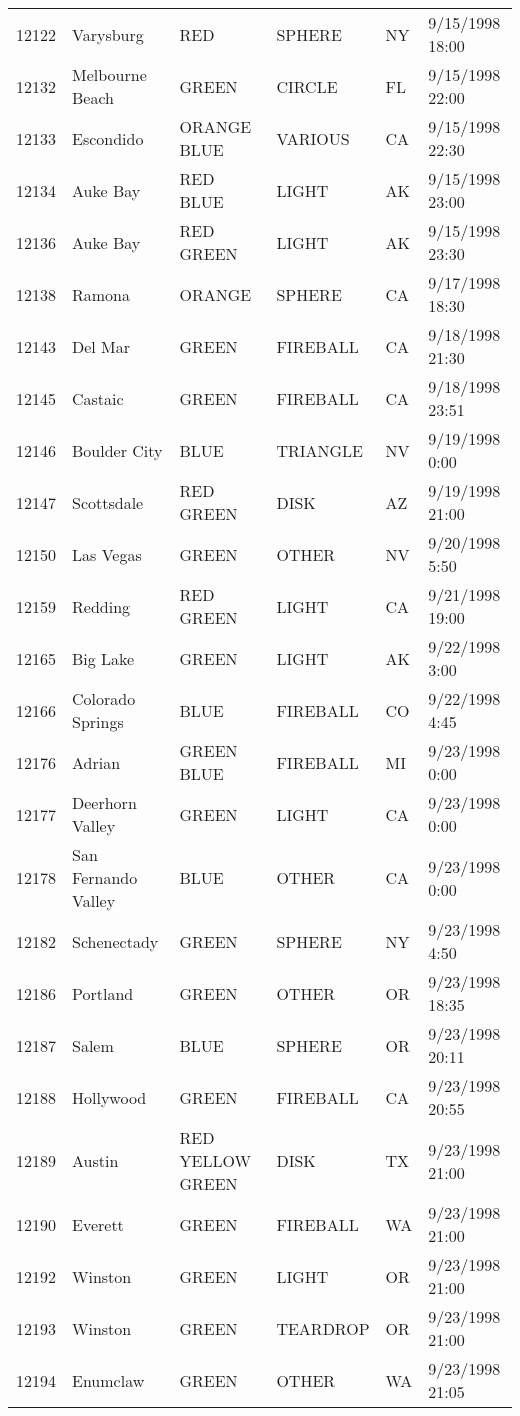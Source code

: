 \begin{tabular}{llllll}
12122 & Varysburg & RED & SPHERE & NY & 9/15/1998 18:00 \\
12132 & Melbourne Beach & GREEN & CIRCLE & FL & 9/15/1998 22:00 \\
12133 & Escondido & ORANGE BLUE & VARIOUS & CA & 9/15/1998 22:30 \\
12134 & Auke Bay & RED BLUE & LIGHT & AK & 9/15/1998 23:00 \\
12136 & Auke Bay & RED GREEN & LIGHT & AK & 9/15/1998 23:30 \\
12138 & Ramona & ORANGE & SPHERE & CA & 9/17/1998 18:30 \\
12143 & Del Mar & GREEN & FIREBALL & CA & 9/18/1998 21:30 \\
12145 & Castaic & GREEN & FIREBALL & CA & 9/18/1998 23:51 \\
12146 & Boulder City & BLUE & TRIANGLE & NV & 9/19/1998 0:00 \\
12147 & Scottsdale & RED GREEN & DISK & AZ & 9/19/1998 21:00 \\
12150 & Las Vegas & GREEN & OTHER & NV & 9/20/1998 5:50 \\
12159 & Redding & RED GREEN & LIGHT & CA & 9/21/1998 19:00 \\
12165 & Big Lake & GREEN & LIGHT & AK & 9/22/1998 3:00 \\
12166 & Colorado Springs & BLUE & FIREBALL & CO & 9/22/1998 4:45 \\
12176 & Adrian & GREEN BLUE & FIREBALL & MI & 9/23/1998 0:00 \\
12177 & Deerhorn Valley & GREEN & LIGHT & CA & 9/23/1998 0:00 \\
12178 & San Fernando Valley & BLUE & OTHER & CA & 9/23/1998 0:00 \\
12182 & Schenectady & GREEN & SPHERE & NY & 9/23/1998 4:50 \\
12186 & Portland & GREEN & OTHER & OR & 9/23/1998 18:35 \\
12187 & Salem & BLUE & SPHERE & OR & 9/23/1998 20:11 \\
12188 & Hollywood & GREEN & FIREBALL & CA & 9/23/1998 20:55 \\
12189 & Austin & RED YELLOW GREEN & DISK & TX & 9/23/1998 21:00 \\
12190 & Everett & GREEN & FIREBALL & WA & 9/23/1998 21:00 \\
12192 & Winston & GREEN & LIGHT & OR & 9/23/1998 21:00 \\
12193 & Winston & GREEN & TEARDROP & OR & 9/23/1998 21:00 \\
12194 & Enumclaw & GREEN & OTHER & WA & 9/23/1998 21:05 \\

\end{tabular}
